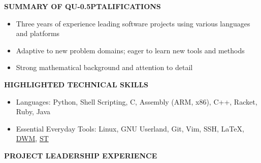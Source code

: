 \documentclass[11pt,letterpaper]{article}
\newif\ifpdf \newif\ifhtml \newif\ifnever \neverfalse
\newlength{\myspacing}\setlength{\myspacing}{0.4\baselineskip}
\def\section#1{\vskip1.75\myspacing\textbf{\uppercase{#1}}\par\nobreak}
\begin{document}
\def\location{Kitchener, Ontario}
\ifpdf
\begin{center}
{\Large{\textbf{Simon Benjamin Orion Parent}}}
\multicolsep=2pt\begin{multicols}{3}
{\location}
\columnbreak
{sboparen@gmail.com}
\columnbreak
{\href{https://sboparen.github.io}{sboparen.github.io}}
\end{multicols}
\end{center}
\vfill
\fi

\ifhtml
\location

Last updated June 2018.
\fi

\section{Summary of Qu\kern -0.5ptalifications}
\begin{itemize}
\item Three years of experience leading software projects
using various languages and platforms
\item Adaptive to new problem domains;
eager to learn new tools and methods
\item Strong mathematical background and attention to detail
\end{itemize}

\section{Highlighted Technical Skills}
\begin{itemize}

\item Languages:
Python, Shell Scripting, C, Assembly (ARM, x86),
C++, Racket, Ruby, Java

\item Essential Everyday Tools:
Linux, GNU Userland, Git, Vim, SSH, \LaTeX,
\href{https://dwm.suckless.org/}{DWM},
\href{https://st.suckless.org/}{ST}

\end{itemize}

\section{Project Leadership Experience}
\end{document}
